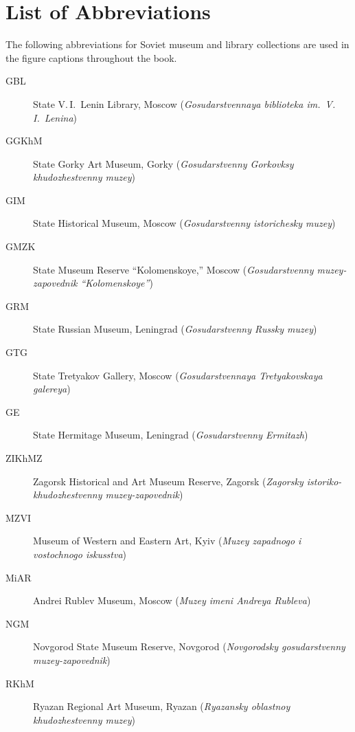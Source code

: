 
\chapter*{List of Abbreviations}


\noindent The following abbreviations for Soviet museum and library collections are used
in the figure captions throughout the book.

\medskip

\begin{description}
  \item[GBL]  State V.\,I.~Lenin Library, Moscow
              (\emph{Gosudarstvennaya biblioteka im.\ V.\,I.~Lenina})
  \item[GGKhM]  State Gorky Art Museum, Gorky
              (\emph{Gosudarstvenny Gorkovksy khudozhestvenny muzey})
  \item[GIM]  State Historical Museum, Moscow
              (\emph{Gosudarstvenny istorichesky muzey})
  \item[GMZK]  State Museum Reserve ``Kolomenskoye,'' Moscow
              (\emph{Gosudarstvenny muzey-zapovednik ``Kolomenskoye''})
  \item[GRM]  State Russian Museum, Leningrad
              (\emph{Gosudarstvenny Russky muzey})


  \item[GTG]  State Tretyakov Gallery, Moscow
              (\emph{Gosudarstvennaya Tretyakovskaya galereya})
  \item[GE]   State Hermitage Museum, Leningrad
              (\emph{Gosudarstvenny Ermitazh})
  \item[ZIKhMZ]  Zagorsk Historical and Art Museum Reserve, Zagorsk
              (\emph{Zagorsky istoriko-khudozhestvenny muzey-zapovednik})
  \item[MZVI]  Museum of Western and Eastern Art, Kyiv
              (\emph{Muzey zapadnogo i vostochnogo iskusstva})
  \item[MiAR]  Andrei Rublev Museum, Moscow
              (\emph{Muzey imeni Andreya Rubleva})
  \item[NGM]  Novgorod State Museum Reserve, Novgorod
              (\emph{Novgorodsky gosudarstvenny muzey-zapovednik})
  \item[RKhM]  Ryazan Regional Art Museum, Ryazan
              (\emph{Ryazansky oblastnoy khudozhestvenny muzey})
\end{description}

